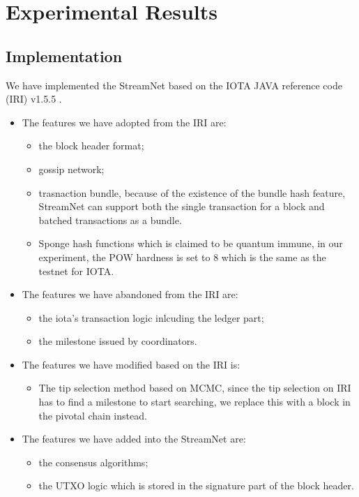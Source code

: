 \section{Experimental Results}

\subsection{Implementation}
We have implemented the StreamNet based on the IOTA JAVA reference code (IRI) v1.5.5 \cite{IOTACode}.

\begin{itemize}
    \item The features we have adopted from the IRI are: 
    \begin{itemize}
        \item the block header format;
        \item gossip network;
        \item trasnaction bundle, because of the existence of the bundle hash feature, StreamNet can support both the single transaction for a block and batched transactions as a bundle. 
        \item Sponge hash functions which is claimed to be quantum immune, in our experiment, the POW hardness is set to 8 which is the same as the testnet for IOTA.
    \end{itemize}

    \item The features we have abandoned from the IRI are:
    \begin{itemize}
        \item the iota's transaction logic inlcuding the ledger part;
        \item the milestone issued by coordinators. 
    \end{itemize}

    \item The features we have modified based on the IRI is: 
    \begin{itemize}
        \item The tip selection method based on MCMC, since the tip selection on IRI has to find a milestone to start searching, we replace this with a block in the pivotal chain instead.
    \end{itemize}


    \item The features we have added into the StreamNet are: 
    \begin{itemize}
        \item the consensus algorithms; 
        \item the UTXO logic which is stored in the signature part of the block header. 
    \end{itemize}
\end{itemize}

